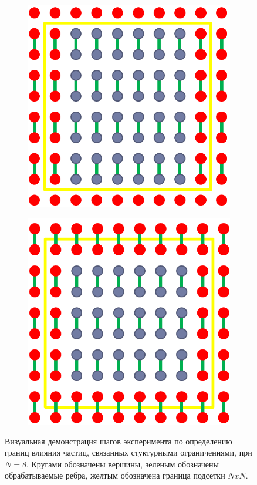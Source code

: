 \begin{figure}[ht]
		\hspace*{\fill}
		\begin{subfigure}[t]{\dimexpr.35\linewidth-1.3em\relax}
			\centering
			\includegraphics[width=.65\linewidth,valign=t]{my_folder/images/chunk_structural_3}
		\end{subfigure}%
		\begin{subfigure}[t]{\dimexpr.35\linewidth-1.3em\relax}
			\centering
			\includegraphics[width=.65\linewidth,valign=t]{my_folder/images/chunk_structural_4}
		\end{subfigure}
		\hspace*{\fill}
		\captionsetup{justification=centering} %
		\caption{Визуальная демонстрация шагов эксперимента по определению границ влияния частиц, связанных стуктурными ограничениями, при $N = 8$. Кругами обозначены вершины, зеленым обозначены обрабатываемые ребра, желтым обозначена граница подсетки $NxN$.}
		\label{fig:chunkStructExp}
	\end{figure}
	\FloatBarrier
	\newpage
	
